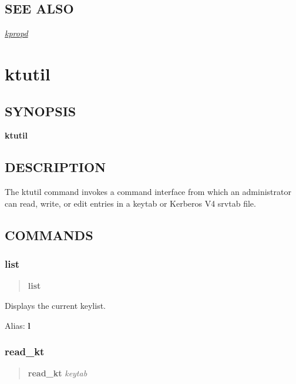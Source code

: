 \documentclass[letterpaper,10pt,english]{sphinxmanual}
\begin{document}
\subsection{SEE ALSO}
\label{admin/admin_commands/kproplog:see-also}
{\hyperref[admin/admin_commands/kpropd:kpropd-8]{\emph{kpropd}}}


\section{ktutil}
\label{admin/admin_commands/ktutil:ktutil-1}\label{admin/admin_commands/ktutil::doc}\label{admin/admin_commands/ktutil:ktutil}

\subsection{SYNOPSIS}
\label{admin/admin_commands/ktutil:synopsis}
\textbf{ktutil}


\subsection{DESCRIPTION}
\label{admin/admin_commands/ktutil:description}
The ktutil command invokes a command interface from which an
administrator can read, write, or edit entries in a keytab or Kerberos
V4 srvtab file.


\subsection{COMMANDS}
\label{admin/admin_commands/ktutil:commands}

\subsubsection{list}
\label{admin/admin_commands/ktutil:list}\begin{quote}

\textbf{list}
\end{quote}

Displays the current keylist.

Alias: \textbf{l}


\subsubsection{read\_kt}
\label{admin/admin_commands/ktutil:read-kt}\begin{quote}

\textbf{read\_kt} \emph{keytab}
\end{quote}
\end{document}
